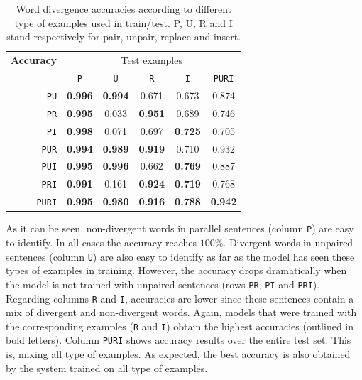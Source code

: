 \documentclass[11pt,a4paper]{article}
\begin{document}
\begin{table}[h]
\small
\center
\begin{tabular}{crccccc}
\hline
\multicolumn{2}{l}{\bf Accuracy} & \multicolumn{5}{c}{Test examples} \\
 &  & \texttt{P} & \texttt{U} & \texttt{R} & \texttt{I} & \texttt{PURI} \\
 \hline
\parbox[t]{0mm}{} &  \texttt{PU}     & \bf 0.996 & \bf 0.994 & 0.671 & 0.673 & 0.874 \\
 &  \texttt{PR}     & \bf 0.995 &      0.033 & \bf 0.951 &      0.689 & 0.746 \\
 &  \texttt{PI}       & \bf 0.998 &      0.071 &      0.697 & \bf 0.725 & 0.705 \\
 &  \texttt{PUR}  & \bf 0.994 & \bf 0.989 & \bf 0.919 &      0.710 & 0.932 \\
 &  \texttt{PUI}    & \bf 0.995 & \bf 0.996 &      0.662 & \bf 0.769 & 0.887 \\
 &  \texttt{PRI}    & \bf 0.991 &      0.161 & \bf 0.924 & \bf 0.719 & 0.768 \\
 &  \texttt{PURI} & \bf 0.995 & \bf 0.980 & \bf 0.916 & \bf 0.788 & \bf 0.942 \\
\hline
\end{tabular}
\caption{Word divergence accuracies according to different type of examples used in train/test. P, U, R and I stand respectively for pair, unpair, replace and insert.}
\label{results_puri}
\end{table}

As it can be seen, non-divergent words in parallel sentences (column \texttt{P}) are easy to identify. 
In all cases the accuracy reaches $100\%$. 
Divergent words in unpaired sentences (column \texttt{U}) are also easy to identify as far as the model has seen these types of examples in training. 
However, the accuracy drops dramatically when the model is not trained with unpaired sentences (rows  \texttt{PR}, \texttt{PI} and \texttt{PRI}).
Regarding columns \texttt{R} and \texttt{I}, accuracies are lower since these sentences contain a mix of divergent and non-divergent words. 
Again, models that were trained with the corresponding examples (\texttt{R} and \texttt{I}) obtain the highest accuracies (outlined in bold letters).
Column \texttt{PURI} shows accuracy results over the entire test set. This is, mixing all type of examples. 
As expected, the best accuracy is also obtained by the system trained on all type of  examples. 
\end{document}
